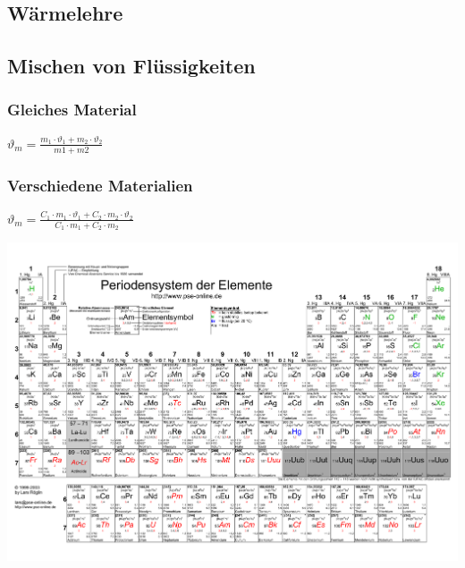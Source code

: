 \documentclass[eglish/german]{latex4ei/latex4ei_sheet}
\begin{document}
				\begin{sectionbox}
					\section{Wärmelehre}
						\subsection{Mischen von Flüssigkeiten}
							\subsubsection{Gleiches Material}
								$\vartheta_m = \frac{m_1 \cdot \vartheta_1 + m_2 \cdot \vartheta_2}{m1+m2}$
							\subsubsection{Verschiedene Materialien}
								$\vartheta_m = \frac{C_1 \cdot m_1 \cdot \vartheta_1+C_2 \cdot m_2 \cdot \vartheta_2}{C_1 \cdot m_1 + C_2 \cdot m_2}$
				\end{sectionbox}
\newpage
	\hspace{-5mm}\includegraphics[width = 29.3cm]{img/pse.pdf}
\end{document}
